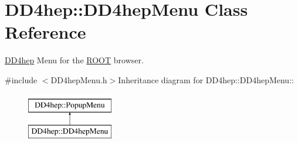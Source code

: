 \hypertarget{class_d_d4hep_1_1_d_d4hep_menu}{
\section{DD4hep::DD4hepMenu Class Reference}
\label{class_d_d4hep_1_1_d_d4hep_menu}
}


\hyperlink{namespace_d_d4hep}{DD4hep} Menu for the \hyperlink{namespace_r_o_o_t}{ROOT} browser.  


{\ttfamily \#include $<$DD4hepMenu.h$>$}Inheritance diagram for DD4hep::DD4hepMenu::\begin{figure}[H]
\begin{center}
\leavevmode
\includegraphics[height=2cm]{class_d_d4hep_1_1_d_d4hep_menu}
\end{center}
\end{figure}
